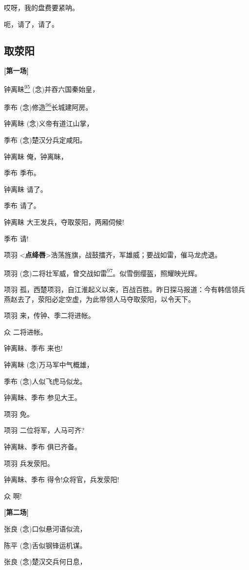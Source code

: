 哎呀，我的盘费要紧呐。

呃，请了，请了。

\hypertarget{ux53d6ux8365ux9633}{%
\subsection{取荥阳}\label{ux53d6ux8365ux9633}}

\textbf{{[}第一场{]}}

钟离眛\protect\hyperlink{fn95}{\textsuperscript{95}}
(念)并吞六国秦始皇，

季布 (念)修造\protect\hyperlink{fn96}{\textsuperscript{96}}长城建阿房。

钟离眛 (念)义帝有道江山掌，

季布 (念)楚汉分兵定咸阳。

钟离眛 俺，钟离眛，

季布 季布。

钟离眛 请了。

季布 请了。

钟离眛 大王发兵，夺取荥阳，两厢伺候!

季布 请!

项羽
\textless{}\textbf{点绛唇}\textgreater{}浩荡旌旗，战鼓擂齐，军雄威；要战如雷，催马龙虎退。

项羽
(念)二将壮军威，曾交战如雷\protect\hyperlink{fn97}{\textsuperscript{97}}。似雪倒缨盔，照耀映光辉。

项羽
孤，西楚项羽，自江淮起义以来，百战百胜。昨日探马报道：今有韩信领兵燕赵去了，荥阳必定空虚，为此带领人马夺取荥阳，以令天下。

项羽 来，传钟、季二将进帐。

众 二将进帐。

钟离眛、季布 来也!

钟离眛 (念)万马军中气概雄，

季布 (念)人似飞虎马似龙。

钟离眛、季布 参见大王。

项羽 免。

项羽 二位将军，人马可齐?

钟离眛、季布 俱已齐备。

项羽 兵发荥阳。

钟离眛、季布 得令!众将官，兵发荥阳!

众 啊!

\textbf{{[}第二场{]}}

张良 (念)口似悬河语似流，

陈平 (念)舌似钢锋运机谋。

张良 (念)楚汉交兵何日息，

